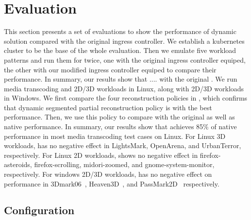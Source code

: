 \section{Evaluation}
\label{sec:evaluation}
This section presents a set of evaluations to show the performance of dynamic solution
compared with the original ingress controller. We establish a kubernetes cluster to be the base of the whole evaluation. Then we emulate five workload patterns and run them for twice, one with the original ingress controller equiped,
the other with our modified ingress controller equiped to compare their performance.
In summary, our results show that ....
with the original \gvirt{}. We run media transcoding and 2D/3D workloads in Linux, along with 2D/3D workloads in Windows.
We first compare the four reconstruction policies in \name{}, which confirms that  dynamic segmented partial reconstruction policy is with the best performance.
Then, we use this policy to compare \name{} with the original \gvirt{} as well as native performance.
In summary, our results show that \name{} achieves 85\% of native performance in most media transcoding test cases on Linux. For Linux 3D workloads, \name{} has
no negative effect in LightsMark, OpenArena, and UrbanTerror, respectively. For Linux 2D workloads, \name{} shows no negative effect in firefox-asteroids, firefox-scrolling,
midori-zoomed, and gnome-system-monitor, respectively. For windows 2D/3D workloads, \name{} has no negative effect on performance in 3Dmark06~{\cite{website:3dmark}},
Heaven3D~{\cite{website:heaven}}, and PassMark2D~{\cite{website:passmark}} respectively.

\subsection{Configuration}

